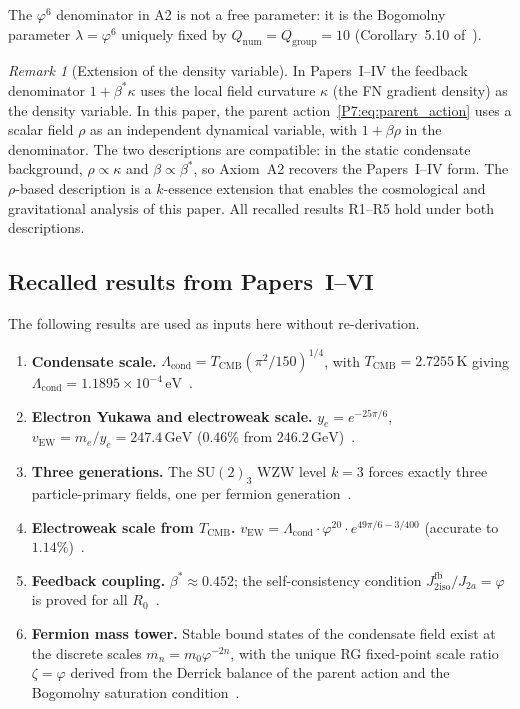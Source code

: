 \documentclass[11pt,a4paper]{article}
\theoremstyle{definition}
\theoremstyle{remark}
\newtheorem{remark}[theorem]{Remark}
\newcommand{\vp}{\varphi}
\newcommand{\bst}{\beta^{*}}
\newcommand{\TCMB}{T_{\mathrm{CMB}}}
\newcommand{\Lcond}{\Lambda_{\mathrm{cond}}}
\newcommand{\vEW}{v_{\mathrm{EW}}}
\newcommand{\Ja}{J_{2a}}
\newcommand{\Jfb}{J_{2\mathrm{iso}}^{\mathrm{fb}}}
\begin{document}
The $\vp^6$ denominator in A2 is not a free parameter: it is the
Bogomolny parameter $\lambda=\vp^6$ uniquely fixed by
$Q_{\mathrm{num}}=Q_{\mathrm{group}}=10$ (Corollary~5.10 of~\cite{Paper1}).

\begin{remark}[Extension of the density variable]
\label{P7:rem:rho_extension}
In Papers~I--IV the feedback denominator $1+\bst\kappa$ uses the local
field curvature $\kappa$ (the FN gradient density) as the density variable.
In this paper, the parent action~\eqref{P7:eq:parent_action} uses a scalar
field $\rho$ as an independent dynamical variable, with $1+\beta\rho$ in
the denominator.  The two descriptions are compatible: in the static
condensate background, $\rho\propto\kappa$ and $\beta\propto\bst$, so
Axiom~A2 recovers the Papers~I--IV form.  The $\rho$-based description
is a $k$-essence extension that enables the cosmological and gravitational
analysis of this paper.  All recalled results R1--R5 hold under both
descriptions.
\end{remark}

\subsection{Recalled results from Papers~I--VI}

The following results are used as inputs here without re-derivation.

\begin{enumerate}[label=\textbf{R\arabic*.},leftmargin=*]

\item \textbf{Condensate scale.}
  $\Lcond = \TCMB(\pi^2/150)^{1/4}$,
  with $\TCMB=2.7255\,\mathrm{K}$ giving
  $\Lcond = 1.1895\times10^{-4}\,\mathrm{eV}$~\cite{Paper4}.

\item \textbf{Electron Yukawa and electroweak scale.}
  $y_e = e^{-25\pi/6}$, $\vEW = m_e/y_e = 247.4\,\mathrm{GeV}$
  ($0.46\%$ from $246.2\,\mathrm{GeV}$)~\cite{Paper1}.

\item \textbf{Three generations.}
  The $\mathrm{SU}(2)_3$ WZW level $k=3$ forces exactly three
  particle-primary fields, one per fermion generation~\cite{Paper4}.

\item \textbf{Electroweak scale from $\TCMB$.}
  $\vEW = \Lcond\cdot\vp^{20}\cdot e^{49\pi/6-3/400}$
  (accurate to $1.14\%$)~\cite{Paper4}.

\item \textbf{Feedback coupling.}
  $\bst\approx0.452$; the self-consistency condition $\Jfb/\Ja=\vp$
  is proved for all $R_0$~\cite{Paper2,Paper3}.

\item \textbf{Fermion mass tower.}
  Stable bound states of the condensate field exist at the discrete
  scales $m_n = m_0\vp^{-2n}$, with the unique RG fixed-point scale ratio
  $\zeta=\vp$ derived from the Derrick balance of the parent action
  and the Bogomolny saturation condition~\cite{Paper6}.

\end{enumerate}
\end{document}
